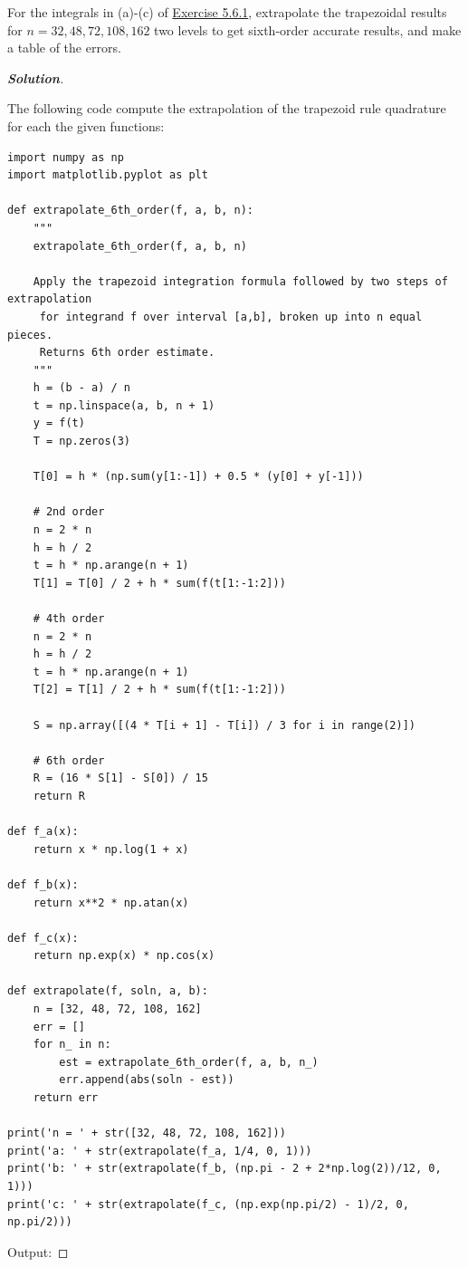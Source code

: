 \documentclass[11pt]{article}
\newenvironment{problem}[2][Question]{\begin{trivlist}
\item[\hskip \labelsep {\bfseries #1}\hskip \labelsep {\bfseries #2.}]}{\end{trivlist}}
\newenvironment{solution}{%
  \begin{proof}[\textbf{Solution}]$ $\par\nobreak\ignorespaces
}{%
  \end{proof}
}
\theoremstyle{definition}
\begin{document}
\begin{problem}{5.6.8}
For the integrals in (a)-(c) of \href{https://fncbook.com/integration/#problem-integration-tests}{Exercise 5.6.1}, extrapolate the trapezoidal results for $n = 32, 48, 72, 108, 162$ two levels to get sixth-order accurate results, and make a table of the errors.
\end{problem}
\begin{solution}
The following code compute the extrapolation of the trapezoid rule quadrature for each the given functions:
\begin{lstlisting}
import numpy as np
import matplotlib.pyplot as plt

def extrapolate_6th_order(f, a, b, n):
    """
    extrapolate_6th_order(f, a, b, n)

    Apply the trapezoid integration formula followed by two steps of extrapolation
     for integrand f over interval [a,b], broken up into n equal pieces.
     Returns 6th order estimate.
    """
    h = (b - a) / n
    t = np.linspace(a, b, n + 1)
    y = f(t)
    T = np.zeros(3)

    T[0] = h * (np.sum(y[1:-1]) + 0.5 * (y[0] + y[-1]))

    # 2nd order
    n = 2 * n
    h = h / 2
    t = h * np.arange(n + 1)
    T[1] = T[0] / 2 + h * sum(f(t[1:-1:2]))

    # 4th order
    n = 2 * n
    h = h / 2
    t = h * np.arange(n + 1)
    T[2] = T[1] / 2 + h * sum(f(t[1:-1:2]))

    S = np.array([(4 * T[i + 1] - T[i]) / 3 for i in range(2)])

    # 6th order
    R = (16 * S[1] - S[0]) / 15
    return R

def f_a(x):
    return x * np.log(1 + x)

def f_b(x):
    return x**2 * np.atan(x)

def f_c(x):
    return np.exp(x) * np.cos(x)

def extrapolate(f, soln, a, b):
    n = [32, 48, 72, 108, 162]
    err = []
    for n_ in n:
        est = extrapolate_6th_order(f, a, b, n_)
        err.append(abs(soln - est))
    return err

print('n = ' + str([32, 48, 72, 108, 162]))
print('a: ' + str(extrapolate(f_a, 1/4, 0, 1)))
print('b: ' + str(extrapolate(f_b, (np.pi - 2 + 2*np.log(2))/12, 0, 1)))
print('c: ' + str(extrapolate(f_c, (np.exp(np.pi/2) - 1)/2, 0, np.pi/2)))
\end{lstlisting}
Output:


\end{solution}
\end{document}
